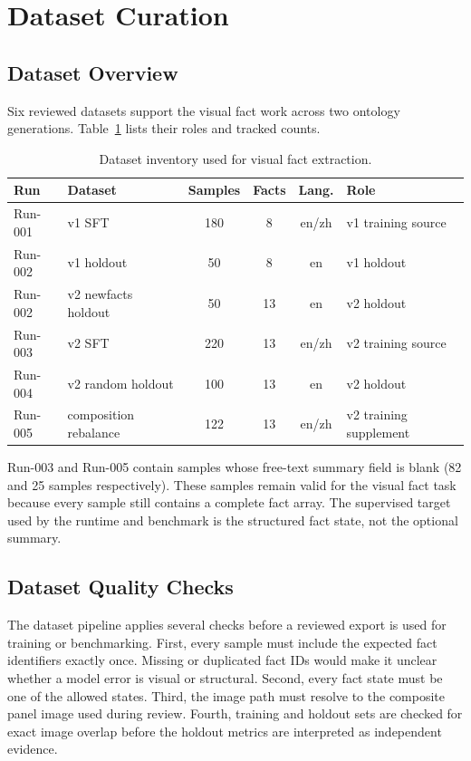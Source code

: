 \section{Dataset Curation}\label{sec:method-datasets}

\subsection{Dataset Overview}

Six reviewed datasets support the visual fact work across two ontology
generations. Table~\ref{tab:datasets} lists their roles and tracked counts.

\begin{table}[htbp]
  \centering
  \caption{Dataset inventory used for visual fact extraction.}
  \label{tab:datasets}
  \small
  \begin{tabularx}{\textwidth}{@{}lXcccX@{}}
  \toprule
  \textbf{Run} & \textbf{Dataset} & \textbf{Samples} & \textbf{Facts} & \textbf{Lang.} & \textbf{Role} \\
  \midrule
  Run-001 & v1 SFT & 180 & 8 & en/zh & v1 training source \\
  Run-002 & v1 holdout & 50 & 8 & en & v1 holdout \\
  Run-002 & v2 newfacts holdout & 50 & 13 & en & v2 holdout \\
  Run-003 & v2 SFT & 220 & 13 & en/zh & v2 training source \\
  Run-004 & v2 random holdout & 100 & 13 & en & v2 holdout \\
  Run-005 & composition rebalance & 122 & 13 & en/zh & v2 training supplement \\
  \bottomrule
  \end{tabularx}
\end{table}

Run-003 and Run-005 contain samples whose free-text summary field is blank
(82 and 25 samples respectively). These samples remain valid for the visual
fact task because every sample still contains a complete fact array. The
supervised target used by the runtime and benchmark is the structured fact
state, not the optional summary.

\subsection{Dataset Quality Checks}

The dataset pipeline applies several checks before a reviewed export is used for
training or benchmarking. First, every sample must include the expected fact
identifiers exactly once. Missing or duplicated fact IDs would make it unclear
whether a model error is visual or structural. Second, every fact state must be
one of the allowed states. Third, the image path must resolve to the composite
panel image used during review. Fourth, training and holdout sets are checked
for exact image overlap before the holdout metrics are interpreted as
independent evidence.

